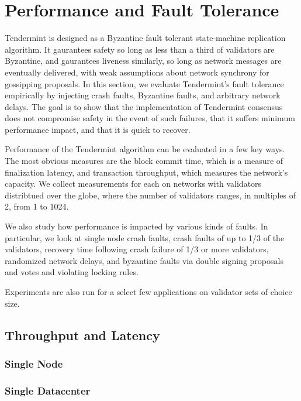 \chapter{Performance and Fault Tolerance}
\label{ch:performance}

Tendermint is designed as a Byzantine fault tolerant state-machine replication algorithm.
It gaurantees safety so long as less than a third of validators are Byzantine, 
and gaurantees liveness similarly, so long as network messages are eventually delivered,
with weak assumptions about network synchrony for gossipping proposals.
In this section, we evaluate Tendermint's fault tolerance empirically by injecting 
crash faults, Byzantine faults, and arbitrary network delays.
The goal is to show that the implementation of Tendermint consensus does not compromise safety in the event of such failures,
that it suffers minimum performance impact, and that it is quick to recover.

Performance of the Tendermint algorithm can be evaluated in a few key ways.
The most obvious measures are the block commit time, which is a measure of finalization latency, 
and transaction throughput, which measures the network's capacity.
We collect measurements for each on networks with validators distribtued over the globe, 
where the number of validators ranges, in multiples of 2, from 1 to 1024.

We also study how performance is impacted by various kinds of faults.
In particular, we look at single node crash faults, crash faults of up to 1/3 of the validators,
recovery time following crash failure of 1/3 or more validators, randomized network delays,
and byzantine faults via double signing proposals and votes and violating locking rules.

Experiments are also run for a select few applications on validator sets of choice size.

\section{Throughput and Latency}

\subsection{Single Node}

\subsection{Single Datacenter}

